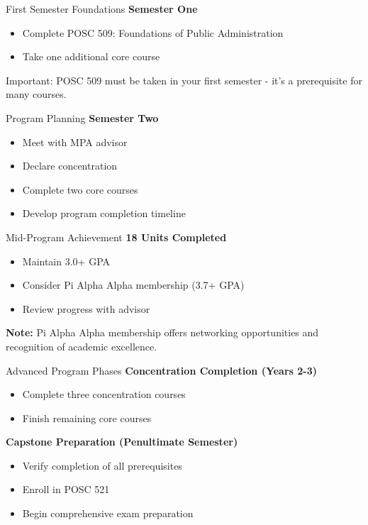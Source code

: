 \documentclass[10pt]{beamer}
\begin{document}
    \begin{frame}{First Semester Foundations}
    \textbf{Semester One}
    \begin{itemize}
    \item Complete POSC 509: Foundations of Public Administration
    \item Take one additional core course
    \end{itemize}
    
    \alert{Important:} POSC 509 must be taken in your first semester - it's a prerequisite for many courses.
    \end{frame}
    
    \begin{frame}{Program Planning}
    \textbf{Semester Two}
    \begin{itemize}
    \item Meet with MPA advisor
    \item Declare concentration
    \item Complete two core courses
    \item Develop program completion timeline
    \end{itemize}
    \end{frame}
    
    \begin{frame}{Mid-Program Achievement}
    \textbf{18 Units Completed}
    \begin{itemize}
    \item Maintain 3.0+ GPA
    \item Consider Pi Alpha Alpha membership (3.7+ GPA)
    \item Review progress with advisor
    \end{itemize}
    
    \textbf{Note:} Pi Alpha Alpha membership offers networking opportunities and recognition of academic excellence.
    \end{frame}
    
    \begin{frame}{Advanced Program Phases}
    \textbf{Concentration Completion (Years 2-3)}
    \begin{itemize}
    \item Complete three concentration courses
    \item Finish remaining core courses
    \end{itemize}
    
    \textbf{Capstone Preparation (Penultimate Semester)}
    \begin{itemize}
    \item Verify completion of all prerequisites
    \item Enroll in POSC 521
    \item Begin comprehensive exam preparation
    \end{itemize}
    \end{frame}
    
\end{document}
